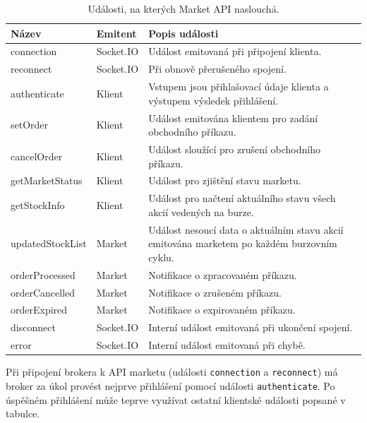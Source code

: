 \documentclass[thesis=M,czech]{FITthesis}[2012/06/26]
\begin{document}
\begin{table}[h]
	\begin{center}
		\def\arraystretch{1.5}%
		\begin{tabular}{|l|l|p{7cm}|}
		\hline
	    \textbf{Název} & \textbf{Emitent} & \textbf{Popis události} \\ \hline
		connection & Socket.IO & Událost emitovaná při připojení klienta. \\ \hline
		reconnect & Socket.IO & Při obnově přerušeného spojení. \\ \hline
		authenticate & Klient & Vstupem jsou přihlašovací údaje klienta a výstupem výsledek přihlášení. \\ \hline
		setOrder & Klient & Událost emitována klientem pro zadání obchodního příkazu. \\ \hline
		cancelOrder & Klient & Událost sloužící pro zrušení obchodního příkazu. \\ \hline
		getMarketStatus & Klient & Událost pro zjištění stavu marketu. \\ \hline
		getStockInfo & Klient & Událost pro načtení aktuálního stavu všech akcií vedených na burze. \\ \hline
		
		updatedStockList & Market & Událost nesoucí data o aktuálním stavu akcií emitována marketem po každém burzovním cyklu. \\ \hline

		orderProcessed & Market & Notifikace o zpracovaném příkazu. \\ \hline

		orderCancelled & Market & Notifikace o zrušeném příkazu. \\ \hline

		orderExpired & Market & Notifikace o expirovaném příkazu. \\ \hline

		disconnect & Socket.IO & Interní událost emitovaná při ukončení spojení. \\ \hline
		error & Socket.IO & Interní událost emitovaná při chybě. \\ \hline
		\end{tabular}
	    \caption{Události, na kterých Market API naslouchá.} 
     	\label{tab:market_api_events}
	\end{center}
\end{table}

	Při připojení brokera k API marketu (události \texttt{connection}	a \texttt{reconnect}) má broker za úkol provést nejprve přihlášení pomocí události \texttt{authenticate}. Po úspěšném přihlášení může teprve využívat ostatní klientské události popsané v tabulce.
	
\end{document}
